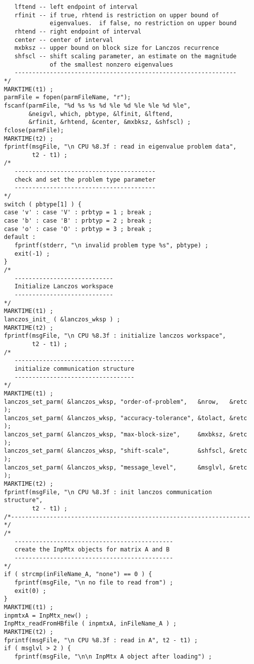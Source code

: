 \begin{verbatim}
   lftend -- left endpoint of interval
   rfinit -- if true, rhtend is restriction on upper bound of
             eigenvalues.  if false, no restriction on upper bound
   rhtend -- right endpoint of interval
   center -- center of interval
   mxbksz -- upper bound on block size for Lanczos recurrence
   shfscl -- shift scaling parameter, an estimate on the magnitude
             of the smallest nonzero eigenvalues
   ---------------------------------------------------------------
*/
MARKTIME(t1) ;
parmFile = fopen(parmFileName, "r");
fscanf(parmFile, "%d %s %s %d %le %d %le %le %d %le", 
       &neigvl, which, pbtype, &lfinit, &lftend, 
       &rfinit, &rhtend, &center, &mxbksz, &shfscl) ;
fclose(parmFile);
MARKTIME(t2) ;
fprintf(msgFile, "\n CPU %8.3f : read in eigenvalue problem data",
        t2 - t1) ;
/*
   ----------------------------------------
   check and set the problem type parameter
   ----------------------------------------
*/
switch ( pbtype[1] ) {
case 'v' : case 'V' : prbtyp = 1 ; break ;
case 'b' : case 'B' : prbtyp = 2 ; break ;
case 'o' : case 'O' : prbtyp = 3 ; break ;
default :
   fprintf(stderr, "\n invalid problem type %s", pbtype) ;
   exit(-1) ;
}
/*
   ----------------------------
   Initialize Lanczos workspace
   ----------------------------
*/
MARKTIME(t1) ;
lanczos_init_ ( &lanczos_wksp ) ;
MARKTIME(t2) ;
fprintf(msgFile, "\n CPU %8.3f : initialize lanczos workspace", 
        t2 - t1) ;
/*
   ----------------------------------
   initialize communication structure
   ----------------------------------
*/
MARKTIME(t1) ;
lanczos_set_parm( &lanczos_wksp, "order-of-problem",   &nrow,   &retc );
lanczos_set_parm( &lanczos_wksp, "accuracy-tolerance", &tolact, &retc );
lanczos_set_parm( &lanczos_wksp, "max-block-size",     &mxbksz, &retc );
lanczos_set_parm( &lanczos_wksp, "shift-scale",        &shfscl, &retc );
lanczos_set_parm( &lanczos_wksp, "message_level",      &msglvl, &retc );
MARKTIME(t2) ;
fprintf(msgFile, "\n CPU %8.3f : init lanczos communication structure", 
        t2 - t1) ;
/*--------------------------------------------------------------------*/
/*
   ---------------------------------------------
   create the InpMtx objects for matrix A and B
   ---------------------------------------------
*/
if ( strcmp(inFileName_A, "none") == 0 ) {
   fprintf(msgFile, "\n no file to read from") ;
   exit(0) ;
}
MARKTIME(t1) ;
inpmtxA = InpMtx_new() ;
InpMtx_readFromHBfile ( inpmtxA, inFileName_A ) ;
MARKTIME(t2) ;
fprintf(msgFile, "\n CPU %8.3f : read in A", t2 - t1) ;
if ( msglvl > 2 ) {
   fprintf(msgFile, "\n\n InpMtx A object after loading") ;

\end{verbatim}
